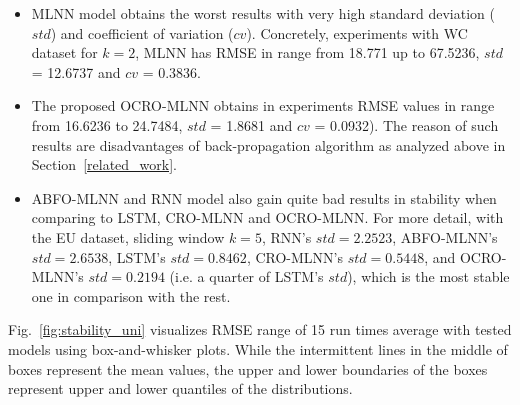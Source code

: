 \documentclass[smallcondensed, natbib]{svjour3}     %
\begin{document}
{\begin{itemize}
\item MLNN model obtains the worst results with very high standard deviation ($std$) and coefficient of variation ($cv$). Concretely, experiments with WC dataset for $k = 2$, MLNN has RMSE in range from 18.771 up to 67.5236, $std$ = 12.6737 and $cv$ = 0.3836.
\item The proposed OCRO-MLNN obtains in experiments RMSE values in range from 16.6236 to 24.7484, $std$ = 1.8681 and $cv$ = 0.0932). The reason of such results are disadvantages of back-propagation algorithm as analyzed above in Section~\ref{related_work}. 
\item ABFO-MLNN and RNN model also gain quite bad results in stability when comparing to LSTM, CRO-MLNN and OCRO-MLNN. For more detail, with the EU dataset, sliding window $k = 5$, RNN's $std = 2.2523$, ABFO-MLNN's $std = 2.6538$, LSTM's $std = 0.8462$, CRO-MLNN's $std = 0.5448$, and OCRO-MLNN's $std = 0.2194$ (i.e. a quarter of LSTM's $std$), which is the most stable one in comparison with the rest.
\end{itemize}

Fig.~\ref{fig:stability_uni} visualizes RMSE range of 15 run times average with tested models using box-and-whisker plots. While the intermittent lines in the middle of boxes represent the mean values, the upper and lower boundaries of the boxes represent upper and lower quantiles of the distributions. 



}
\end{document}
